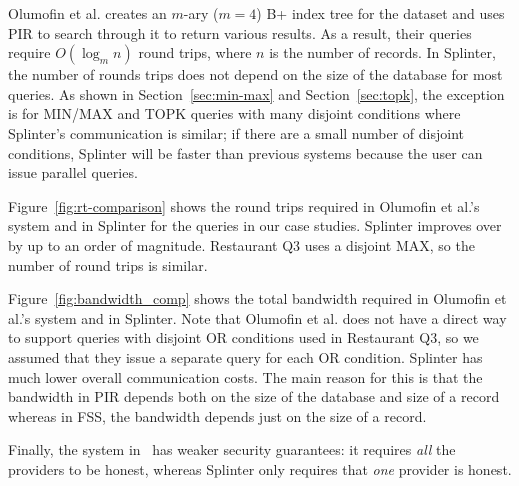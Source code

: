 Olumofin et al. creates
an $m$-ary ($m=4$) B+ index tree for the dataset and
uses PIR to search through
it to return various results. As a result, their queries
require $O(\log_m n)$ round trips, where $n$ is
the number of records. In Splinter, the number of rounds trips
does not depend on the size of the database for most queries.
As shown in Section~\ref{sec:min-max} and Section~\ref{sec:topk}, 
the exception is for MIN/MAX and TOPK queries with many disjoint
conditions where Splinter's
communication is similar; if there are a small number of disjoint
conditions, Splinter will be faster than previous systems 
because the user can issue parallel queries.

Figure~\ref{fig:rt-comparison} shows 
the round trips required in Olumofin et al.'s system and in Splinter
for the queries in our case studies. Splinter improves over~\cite{goldberg}
by up to an order of magnitude. Restaurant Q3
uses a disjoint MAX, so the number of round trips is similar.

Figure~\ref{fig:bandwidth_comp} shows the total bandwidth
required in Olumofin et al.'s system and in Splinter. Note that
Olumofin et al. does not have a direct way to support queries with
disjoint OR conditions used in Restaurant Q3, so we assumed that they issue a separate query
for each OR condition. Splinter has much lower overall communication
costs. The main reason for this is that the bandwidth
in PIR depends both on the size of the database and size of a record
whereas in FSS, the bandwidth depends just on the size of a record.

Finally, the system in~\cite{goldberg} has weaker security guarantees:
it requires \textit{all} the providers to be honest, whereas Splinter
only requires that \textit{one} provider is honest.


